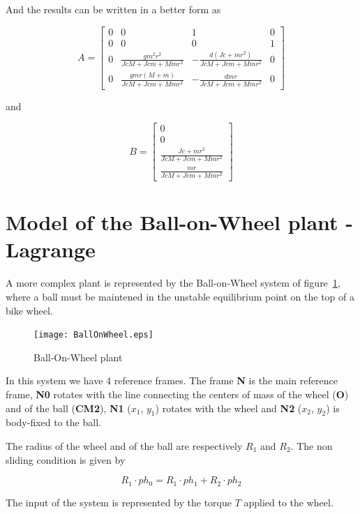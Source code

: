 And the results can be written in a better form as

$$
A=\left[\begin{matrix}0 & 0 & 1 & 0\\0 & 0 & 0 & 1\\0 & \frac{g m^{2} r^{2}}{Jc 
M + Jc m + M m r^{2}} & - \frac{d \left(Jc + m r^{2}\right)}{Jc M + Jc m + M m 
r^{2}} & 0\\0 & \frac{g m r \left(M + m\right)}{Jc M + Jc m + M m r^{2}} & - 
\frac{d m r}{Jc M + Jc m + M m r^{2}} & 0\end{matrix}\right]
$$

and 

$$
B=\left[\begin{matrix}0\\0\\\frac{Jc + m r^{2}}{Jc M + Jc m + M m 
r^{2}}\\\frac{m r}{Jc M + Jc m + M m r^{2}}\end{matrix}\right]
$$

\section{Model of the Ball-on-Wheel plant - Lagrange}

A more complex plant is represented by the Ball-on-Wheel system of 
figure~\ref{F9b}, where a ball must be maintened in the unstable equilibrium 
point on the top of a bike wheel.

\begin{figure}[htbp]	%
\centering
\texttt{[image: BallOnWheel.eps]}
\caption{Ball-On-Wheel plant}
\label{F9b}
\end{figure}

In this system we have 4 reference frames. The frame \textbf{N} is the main 
reference frame, \textbf{N0} rotates with the line connecting the centers of 
mass of the wheel (\textbf{O}) and of the ball (\textbf{CM2}), \textbf{N1} 
($x_1$, $y_1$) rotates with the wheel and \textbf{N2} ($x_2$, $y_2$) is 
body-fixed to the ball.

The radius of the wheel and of the ball are respectively $R_1$ and $R_2$. The 
non sliding condition is given by

$$
R_1 \cdot ph_0=R_1 \cdot ph_1 + R_2 \cdot ph_2
$$

The input of the system is represented by the torque $T$ applied to the wheel.

